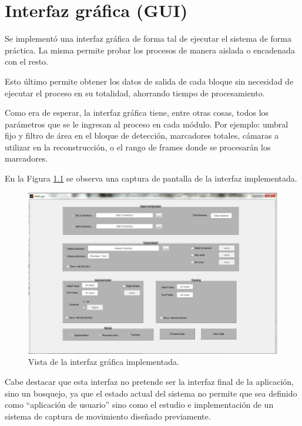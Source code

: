 \chapter{Interfaz gráfica (GUI)}

Se implementó una interfaz gráfica de forma tal de ejecutar el sistema de forma práctica. La misma permite probar los procesos de manera aislada o encadenada con el resto.

Esto último permite obtener los datos de salida de cada bloque sin necesidad de ejecutar el proceso en su totalidad, ahorrando tiempo de procesamiento.

Como era de esperar, la interfaz gráfica tiene, entre otras cosas, todos los parámetros que se le ingresan al proceso en cada módulo. Por ejemplo: umbral fijo y filtro de área en el bloque de detección, marcadores totales, cámaras a utilizar en la reconstrucción, o el rango de frames donde se procesarán los marcadores.

En la Figura \ref{guiVent} se observa una captura de pantalla de la interfaz implementada.

\begin{figure}[ht!]
\hspace{-1cm}
\includegraphics[scale=0.53]{img/gui.png}
\caption{Vista de la interfaz gráfica implementada.}
\label{guiVent}
\end{figure}

Cabe destacar que esta interfaz no pretende ser la interfaz final de la aplicación, sino un bosquejo, ya que el estado actual del sistema no permite que sea definido como ``aplicación de usuario'' sino como el estudio e implementación de un sistema de captura de movimiento diseñado previamente.

